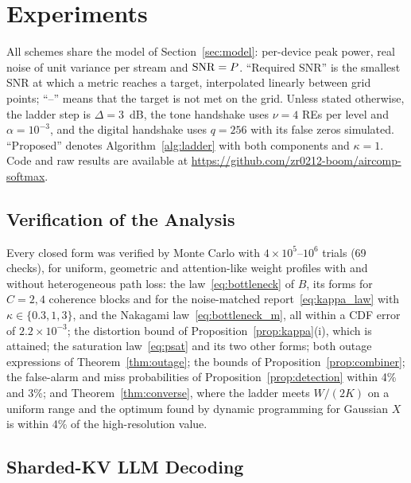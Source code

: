 \section{Experiments}
\label{sec:exp}

All schemes share the model of Section~\ref{sec:model}: per-device peak power, real noise of unit variance per stream and $\mathrm{SNR}=P$. ``Required SNR'' is the smallest SNR at which a metric reaches a target, interpolated linearly between grid points; ``--'' means that the target is not met on the grid. Unless stated otherwise, the ladder step is $\Delta=3$~dB, the tone handshake uses $\nu=4$ REs per level and $\alpha=10^{-3}$, and the digital handshake uses $q=256$ with its false zeros simulated. ``Proposed'' denotes Algorithm~\ref{alg:ladder} with both components and $\kappa=1$. Code and raw results are available at \url{https://github.com/zr0212-boom/aircomp-softmax}.

\subsection{Verification of the Analysis}

Every closed form was verified by Monte Carlo with $4\times10^5$--$10^6$ trials (69 checks), for uniform, geometric and attention-like weight profiles with and without heterogeneous path loss: the law~\eqref{eq:bottleneck} of $B$, its forms for $C=2,4$ coherence blocks and for the noise-matched report~\eqref{eq:kappa_law} with $\kappa\in\{0.3,1,3\}$, and the Nakagami law~\eqref{eq:bottleneck_m}, all within a CDF error of $2.2\times10^{-3}$; the distortion bound of Proposition~\ref{prop:kappa}(i), which is attained; the saturation law~\eqref{eq:psat} and its two other forms; both outage expressions of Theorem~\ref{thm:outage}; the bounds of Proposition~\ref{prop:combiner}; the false-alarm and miss probabilities of Proposition~\ref{prop:detection} within 4\% and 3\%; and Theorem~\ref{thm:converse}, where the ladder meets $W/(2K)$ on a uniform range and the optimum found by dynamic programming for Gaussian $X$ is within 4\% of the high-resolution value.

\subsection{Sharded-KV LLM Decoding}


